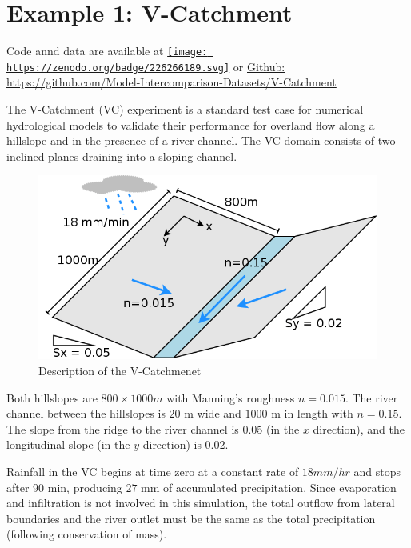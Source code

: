 \documentclass[]{scrbook}
\begin{document}
\section{Example 1: V-Catchment}\label{example-1-v-catchment}

Code annd data are available at
\href{https://zenodo.org/badge/latestdoi/226266189}{\texttt{[image: https://zenodo.org/badge/226266189.svg]}}
or
\href{https://github.com/Model-Intercomparison-Datasets/V-Catchment}{Github:
https://github.com/Model-Intercomparison-Datasets/V-Catchment}

The V-Catchment (VC) experiment is a standard test case for numerical
hydrological models to validate their performance for overland flow
along a hillslope and in the presence of a river channel. The VC domain
consists of two inclined planes draining into a sloping channel.

\begin{figure}
\centering
\includegraphics{Fig/Example/vCat/Vcat.png}
\caption{Description of the V-Catchmenet}
\end{figure}

Both hillslopes are \(800 \times 1000 m\) with Manning's roughness
\(n=0.015\). The river channel between the hillslopes is \(20\) m wide
and \(1000\) m in length with \(n=0.15\). The slope from the ridge to
the river channel is 0.05 (in the \(x\) direction), and the longitudinal
slope (in the \(y\) direction) is 0.02.

Rainfall in the VC begins at time zero at a constant rate of
\(18 mm/hr\) and stops after 90 min, producing \(27\) mm of accumulated
precipitation. Since evaporation and infiltration is not involved in
this simulation, the total outflow from lateral boundaries and the river
outlet must be the same as the total precipitation (following
conservation of mass).
\end{document}
